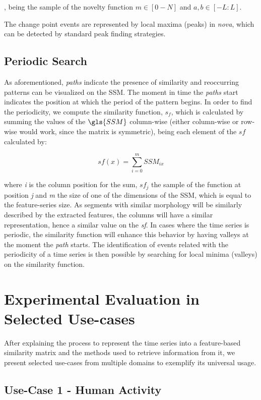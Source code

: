 , being the sample of the novelty function $m \in [0-N]$ and $a, b \in [-L:L]$.
\par
The change point events are represented by local maxima (peaks) in \textit{nova}, which can be detected by standard peak finding strategies.

\subsection{Periodic Search}

As aforementioned, \textit{paths} indicate the presence of similarity and reoccurring patterns can be visualized on the \gls{SSM}. The moment in time the \textit{paths} start indicates the position at which the period of the pattern begins. In order to find the periodicity, we compute the similarity function, $s_f$, which is calculated by summing the values of the $\gls{SSM}$ column-wise (either column-wise or row-wise would work, since the matrix is symmetric), being each element of the $sf$ calculated by:

\begin{equation}
sf(x) = \sum_{i=0}^{m}{SSM_{ix}}
\end{equation}

\noindent where \textit{i} is the column position for the sum, $sf_{j}$ the sample of the function at position \textit{j} and \textit{m} the size of one of the dimensions of the \gls{SSM}, which is equal to the feature-series size. As segments with similar morphology will be similarly described by the extracted features, the columns will have a similar representation, hence a similar value on the \textit{sf}. In cases where the time series is periodic, the similarity function will enhance this behavior by having valleys at the moment the \textit{path} starts. The identification of events related with the periodicity of a time series is then possible by searching for local minima (valleys) on the similarity function.  

\section{Experimental Evaluation in Selected Use-cases}

After explaining the process to represent the time series into a feature-based similarity matrix and the methods used to retrieve information from it, we present selected use-cases from multiple domains to exemplify its universal usage.

\subsection{Use-Case 1 - Human Activity}

